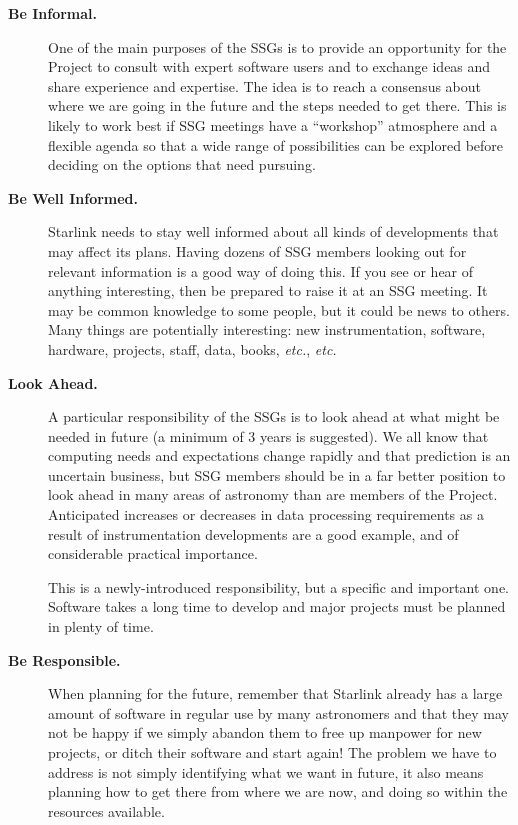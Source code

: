 \documentclass[twoside,11pt]{article}
\newcommand{\st}[1]{{\em{#1}}}
\newcommand{\qt}[1]{``#1''}
\newcommand{\qt}[1]{{\tt{"}}#1{\tt{"}}}
\begin{document}
\begin{description}

\item [{\bf Be Informal.}] One of the main purposes of the SSGs is to
provide an opportunity for the Project to consult with expert software
users and to exchange ideas and share experience and expertise. The
idea is to reach a consensus about where we are going in the future
and the steps needed to get there. This is likely to work best if SSG
meetings have a \qt{workshop} atmosphere and a flexible agenda so that
a wide range of possibilities can be explored before deciding on the
options that need pursuing.

\item[{\bf Be Well Informed.}] Starlink needs to stay well informed
about all kinds of developments that may affect its plans. Having
dozens of SSG members looking out for relevant information is a good
way of doing this. If you see or hear of anything interesting, then be
prepared to raise it at an SSG meeting. It may be common knowledge
to some people, but it could be news to others. Many things are
potentially interesting: new instrumentation, software, hardware,
projects, staff, data, books, \st{etc.}, \st{etc.}

\item[{\bf Look Ahead.}] A particular responsibility of the SSGs is to
look ahead at what might be needed in future (a minimum of 3 years is
suggested). We all know that computing needs and expectations change
rapidly and that prediction is an uncertain business, but SSG members
should be in a far better position to look ahead in many areas of
astronomy than are members of the Project.  Anticipated increases or
decreases in data processing requirements as a result of
instrumentation developments are a good example, and of considerable
practical importance.

This is a newly-introduced responsibility, but a specific and
important one. Software takes a long time to develop and major
projects must be planned in plenty of time.

\item[{\bf Be Responsible.}] When planning for the future, remember
that Starlink already has a large amount of software in regular use by
many astronomers and that they may not be happy if we simply abandon
them to free up manpower for new projects, or ditch their software and
start again! The problem we have to address is not simply identifying
what we want in future, it also means planning how to get there from
where we are now, and doing so within the resources available.


\end{description}
\end{document}
